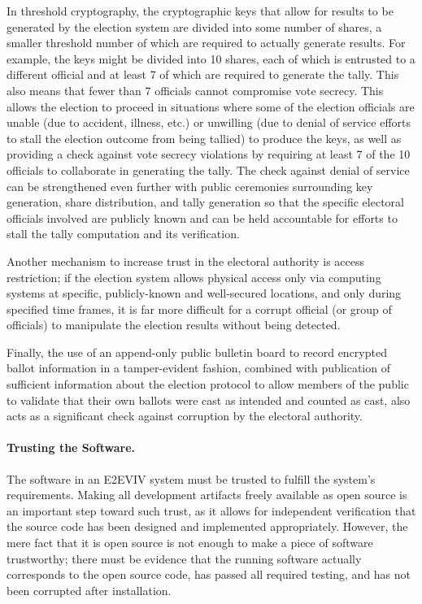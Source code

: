 In threshold cryptography, 
the cryptographic keys that allow for results to be generated by the
election system are divided into some number of shares, a smaller
threshold number of which are required to actually generate
results. For example, the keys might be divided into 10 shares, each
of which is entrusted to a different official and at least 7 of which
are required to generate the tally. This also means that fewer than 7 officials cannot compromise vote secrecy. This allows the election to
proceed in situations where some of the election officials are unable
(due to accident, illness, etc.) or unwilling (due to denial of service efforts to stall the election outcome from being tallied) to
produce the keys, as well as providing a check against vote secrecy violations by
requiring at least 7 of the 10 officials to collaborate in generating
the tally. The check against denial of service can be strengthened even
further with public ceremonies surrounding key generation, share
distribution, and tally generation so that the specific electoral
officials involved are publicly known and can be held accountable for
efforts to stall the tally computation and its verification. 

 Another mechanism to increase trust in the electoral authority is
access restriction; if the election system allows physical access only
via computing systems at specific, publicly-known and well-secured
locations, and only during specified time frames, it is far more
difficult for a corrupt official (or group of officials) to manipulate
the election results without being detected.

Finally, the use of an append-only public bulletin board to record
encrypted ballot information in a tamper-evident fashion, combined
with publication of sufficient information about the election protocol
to allow members of the public to validate that their own ballots were
cast as intended and counted as cast, also acts as a significant check
against corruption by the electoral authority.

\paragraph{Trusting the Software.} The software in an E2EVIV system
must be trusted to fulfill the system's requirements. Making all
development artifacts freely available as open source is an important
step toward such trust, as it allows for independent verification that
the source code has been designed and implemented
appropriately. However, the mere fact that it is open source is not
enough to make a piece of software trustworthy; there must be evidence
that the running software actually corresponds to the open source
code, has passed all required testing, and has not been corrupted
after installation.

